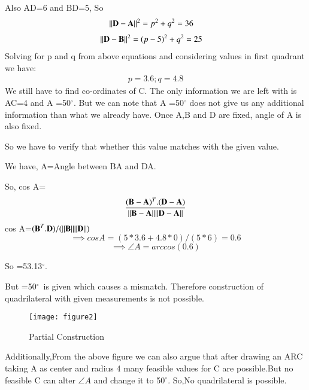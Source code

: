 \documentclass[journal,12pt,twocolumn]{IEEEtran}
\begin{document}
Also AD=6 and BD=5, So
\begin{align}
\Vert\mathbf{D}-\mathbf{A}\rVert^2 &= p^2+q^2=36
\end{align}
\begin{align}
\Vert\mathbf{D}-\mathbf{B}\rVert^2 &= (p-5)^2+q^2=25
\end{align}
Solving for p and q from above equations and considering values in first 
quadrant we have:
\begin{align}
p=3.6;q=4.8
\end{align}
We still have to find co-ordinates of C. The only information we are left
with is AC=4 and \angle A =50$^\circ$.
But we can note that \angle A =50$^\circ$ does not give us any additional
information than what we already have. Once A,B and D are fixed, angle of A
is also fixed. 

So we have to verify that whether this value matches
with the given value.
  
We have,
A=Angle between BA and DA. 

So, cos A= $$\frac{(\textbf{B}-\textbf{A})^T.(\textbf{D}-\textbf{A})}{\Vert\mathbf{B}-\mathbf{A}\rVert\Vert\mathbf{D}-\mathbf{A}\rVert}$$
\implies cos A=$(\textbf{B}^T.\textbf{D})/(\Vert\mathbf{B}\rVert\Vert\mathbf{D}\rVert)$
\quad {}
 $$\implies cos A=(5*3.6+4.8*0)/(5*6)=0.6$$
 $$\implies \angle A=arccos(0.6)$$
 
 So =53.13$^\circ$.
 
 
 But =50$^\circ$\ is given which causes a mismatch. Therefore construction of quadrilateral with given measurements is not possible.


\begin{figure}[!ht]
\centering
\texttt{[image: figure2]}
\caption{ Partial Construction}
\label{fig:right_angle_triangle}	
\end{figure}


Additionally,From the above figure we can also argue that after drawing an ARC taking A as center and radius 4 many feasible values for C are possible.But no feasible C can alter $\angle {A}$ and change it to 50$^\circ$.
So,No quadrilateral is possible.
\end{document}
